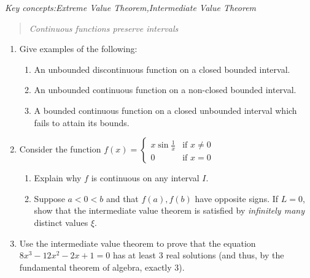 \begin{exercises}
	\emph{Key concepts:\quad Extreme Value Theorem,\quad Intermediate Value Theorem}\vspace{-5pt}
	\begin{quote}
		\emph{Continuous functions preserve intervals}
	\end{quote}

	\begin{enumerate}%
	  \item Give examples of the following:
	  \begin{enumerate}
	    \item An unbounded discontinuous function on a closed bounded interval.
	    \item An unbounded continuous function on a non-closed bounded interval.
	    \item A bounded continuous function on a closed unbounded interval which fails to attain its bounds.
		\end{enumerate}
		
	
		
		
		\item\label{exs:intvalinfty} Consider the function $f(x)=
		\begin{cases}
			x\sin\frac 1x&\text{if }x\neq 0\\
			0&\text{if }x=0
		\end{cases}$
		\begin{enumerate}
		  \item Explain why $f$ is continuous on any interval $I$.
		  \item Suppose $a<0<b$ and that $f(a),f(b)$ have opposite signs. If $L=0$, show that the intermediate value theorem is satisfied by \emph{infinitely many} distinct values $\xi$.
		\end{enumerate}

	
		\item Use the intermediate value theorem to prove that the equation $8x^3-12x^2-2x+1=0$ has at least 3 real solutions (and thus, by the fundamental theorem of algebra, exactly 3).
		

\end{enumerate}
\end{exercises}
